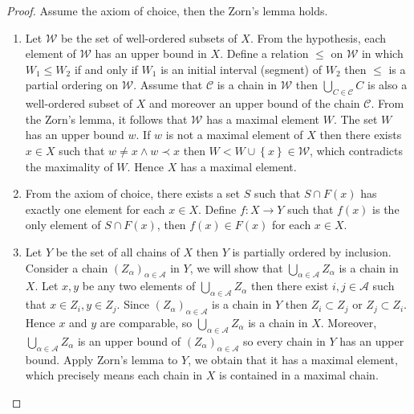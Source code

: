 \begin{proof}
	Assume the axiom of choice, then the Zorn's lemma holds.

	\begin{enumerate}[label={(\alph*)}]
		\item Let \( \mathcal{W} \) be the set of well-ordered subsets of \( X \). From the hypothesis, each element of \( \mathcal{W} \) has an upper bound in \( X \). Define a relation \( \le \) on \( \mathcal{W} \) in which \( W_{1} \le W_{2} \) if and only if \( W_{1} \) is an initial interval (segment) of \( W_{2} \) then \( \le \) is a partial ordering on \( \mathcal{W} \). Assume that \( \mathscr{C} \) is a chain in \( \mathcal{W} \) then \( \bigcup_{C \in \mathscr{C}} C \) is also a well-ordered subset of \( X \) and moreover an upper bound of the chain \( \mathscr{C} \). From the Zorn's lemma, it follows that \( \mathcal{W} \) has a maximal element \( W \). The set \( W \) has an upper bound \( w \). If \( w \) is not a maximal element of \( X \) then there exists \( x \in X \) such that \( w \ne x \land  w \prec x \) then \( W < W \cup \left\{ x \right\} \in \mathcal{W} \), which contradicts the maximality of \( W \). Hence \( X \) has a maximal element.
		\item From the axiom of choice, there exists a set \( S \) such that \( S \cap F(x) \) has exactly one element for each \( x \in X \). Define \( f: X \to Y \) such that \( f(x) \) is the only element of \( S \cap F(x) \), then \( f(x) \in F(x) \) for each \( x \in X \).
		\item Let \( Y \) be the set of all chains of \( X \) then \( Y \) is partially ordered by inclusion. Consider a chain \( {(Z_{\alpha})}_{\alpha\in\mathscr{A}} \) in \( Y \), we will show that \( \bigcup_{\alpha\in\mathscr{A}} Z_{\alpha} \) is a chain in \( X \). Let \( x, y \) be any two elements of \( \bigcup_{\alpha\in\mathscr{A}} Z_{\alpha} \) then there exist \( i, j \in \mathscr{A} \) such that \( x \in Z_{i}, y \in Z_{j} \). Since \( {(Z_{\alpha})}_{\alpha\in\mathscr{A}} \) is a chain in \( Y \) then \( Z_{i} \subset Z_{j} \) or \( Z_{j} \subset Z_{i} \). Hence \( x \) and \( y \) are comparable, so \( \bigcup_{\alpha\in\mathscr{A}} Z_{\alpha} \) is a chain in \( X \). Moreover, \( \bigcup_{\alpha\in\mathscr{A}} Z_{\alpha} \) is an upper bound of \( {(Z_{\alpha})}_{\alpha\in\mathscr{A}} \) so every chain in \( Y \) has an upper bound. Apply Zorn's lemma to \( Y \), we obtain that it has a maximal element, which precisely means each chain in \( X \) is contained in a maximal chain.

\end{enumerate}
\end{proof}
